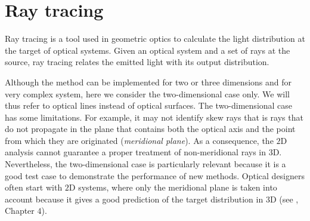 \chapter{Ray tracing}\label{chap:raytracing}
Ray tracing is a tool used in geometric optics to calculate the light distribution at the target of optical systems.
Given an optical system and a set of rays at the source, ray tracing relates the emitted light with its output distribution. 

Although the method can be implemented for two or three dimensions and for very complex system, here we consider the two-dimensional case only. 
We will thus refer to optical lines instead of optical surfaces.
The two-dimensional case has some limitations. For example, it may not identify skew rays that is rays that do not propagate in the plane that contains both the optical axis and the point from which they are originated (\textit{meridional plane}). As a consequence, the $2$D analysis cannot guarantee a proper treatment of non-meridional rays in $3$D. 
Nevertheless, the two-dimensional case is particularly relevant because it is a good test case to demonstrate the performance of new methods.
Optical designers often start with $2$D systems, where only the meridional plane is taken into account because it gives a good prediction of the target distribution in $3$D
(see \cite{winston2005nonimaging}, Chapter $4$).
